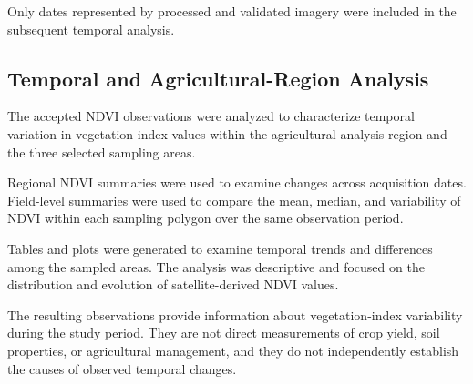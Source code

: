 Only dates represented by processed and
validated imagery were included in the
subsequent temporal analysis.


\subsection{Temporal and Agricultural-Region Analysis}
\label{subsec:temporal-analysis}

The accepted NDVI observations were analyzed
to characterize temporal variation in
vegetation-index values within the agricultural
analysis region and the three selected
sampling areas.

Regional NDVI summaries were used to examine
changes across acquisition dates. Field-level
summaries were used to compare the mean,
median, and variability of NDVI within each
sampling polygon over the same observation
period.

Tables and plots were generated to examine
temporal trends and differences among
the sampled areas. The analysis was
descriptive and focused on the distribution
and evolution of satellite-derived NDVI
values.

The resulting observations provide information
about vegetation-index variability during
the study period. They are not direct
measurements of crop yield, soil properties,
or agricultural management, and they do not
independently establish the causes of
observed temporal changes.